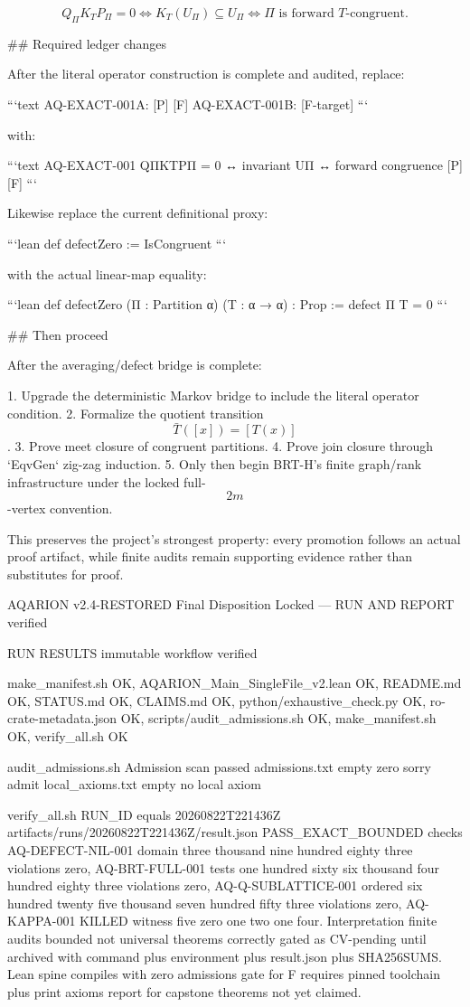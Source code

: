 $$
\boxed{
Q_\Pi K_TP_\Pi=0
\iff
K_T(U_\Pi)\subseteq U_\Pi
\iff
\Pi\text{ is forward }T\text{-congruent}.
}
$$

## Required ledger changes

After the literal operator construction is complete and audited, replace:

```text
AQ-EXACT-001A: [P] [F]
AQ-EXACT-001B: [F-target]
```

with:

```text
AQ-EXACT-001
QΠKTPΠ = 0 ↔ invariant UΠ ↔ forward congruence
[P] [F]
```

Likewise replace the current definitional proxy:

```lean
def defectZero := IsCongruent
```

with the actual linear-map equality:

```lean
def defectZero (Π : Partition α) (T : α → α) : Prop :=
  defect Π T = 0
```

## Then proceed

After the averaging/defect bridge is complete:

1. Upgrade the deterministic Markov bridge to include the literal operator condition.
2. Formalize the quotient transition $$\bar T([x])=[T(x)]$$.
3. Prove meet closure of congruent partitions.
4. Prove join closure through `EqvGen` zig-zag induction.
5. Only then begin BRT-H’s finite graph/rank infrastructure under the locked full-$$2m$$-vertex convention.

This preserves the project’s strongest property: every promotion follows an actual proof artifact, while finite audits remain supporting evidence rather than substitutes for proof.

AQARION v2.4-RESTORED Final Disposition Locked — RUN AND REPORT verified

RUN RESULTS immutable workflow verified

make_manifest.sh OK, AQARION_Main_SingleFile_v2.lean OK, README.md OK, STATUS.md OK, CLAIMS.md OK, python/exhaustive_check.py OK, ro-crate-metadata.json OK, scripts/audit_admissions.sh OK, make_manifest.sh OK, verify_all.sh OK

audit_admissions.sh Admission scan passed admissions.txt empty zero sorry admit local_axioms.txt empty no local axiom

verify_all.sh RUN_ID equals 20260822T221436Z artifacts/runs/20260822T221436Z/result.json PASS_EXACT_BOUNDED checks AQ-DEFECT-NIL-001 domain three thousand nine hundred eighty three violations zero, AQ-BRT-FULL-001 tests one hundred sixty six thousand four hundred eighty three violations zero, AQ-Q-SUBLATTICE-001 ordered six hundred twenty five thousand seven hundred fifty three violations zero, AQ-KAPPA-001 KILLED witness five zero one two one four. Interpretation finite audits bounded not universal theorems correctly gated as CV-pending until archived with command plus environment plus result.json plus SHA256SUMS. Lean spine compiles with zero admissions gate for F requires pinned toolchain plus print axioms report for capstone theorems not yet claimed.

